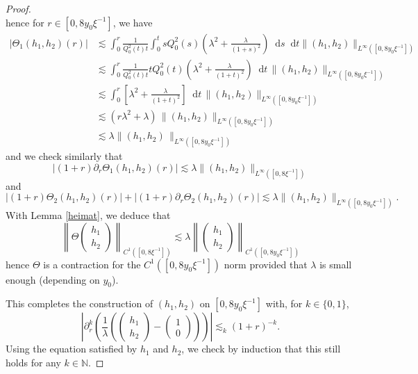 \documentclass[11 pt]{amsart}
\theoremstyle{definition}
\theoremstyle{remark}
\numberwithin{equation}{section}
\newcommand{\dd}{\mathop{}\!\mathrm{d}}
\begin{document}
\begin{proof}
\[  \]
  hence for $r \in [0, 8  y_0\xi^{- 1}]$, we have
  \begin{align*}
| \Theta_1 (h_1, h_2) (r) | & \lesssim \int_0^r \frac{1}{Q_0^2 (t) t} \int_0^t s Q_0^2 (s) \left(
    \lambda^2 + \frac{\lambda}{(1 + s)^2} \right) \dd s \dd t \| (h_1, h_2)
    \|_{L^{\infty} ([0, 8  y_0\xi^{- 1}])}\\
    & \lesssim \int_0^r \frac{1}{Q_0^2 (t) t} t Q_0^2 (t) \left( \lambda^2
    + \frac{\lambda}{(1 + t)^2} \right)\dd t \, \| (h_1, h_2) \|_{L^{\infty} ([0,
    8 y_0 \xi^{- 1}])}\\
    & \lesssim \int_0^r \left[ \lambda^2 + \frac{\lambda}{(1 + t)^2} \right] \dd t \, \| (h_1,
    h_2) \|_{L^{\infty} ([0, 8 y_0 \xi^{- 1}])}\\
    & \lesssim (r \lambda^2 + \lambda) \, \| (h_1, h_2) \|_{L^{\infty} ([0, 8 y_0
    \xi^{- 1}])}\\
    & \lesssim \lambda \| (h_1, h_2)\, \|_{L^{\infty} ([0, 8 y_0 \xi^{- 1}])}
  \end{align*}
  and we check similarly that
  \[ | (1 + r) \partial_r \Theta_1 (h_1, h_2) (r) | \lesssim \lambda\| (h_1, h_2)
     \|_{L^{\infty} ([0, 8 \xi^{- 1}])} \]
and
  \[ | (1 + r) \Theta_2 (h_1, h_2) (r) | + | (1 + r) \partial_r \Theta_2 (h_1,
     h_2) (r) | \lesssim \lambda \| (h_1, h_2) \|_{L^{\infty} ([0, 8 y_0 \xi^{-
     1}])} . \]
  With Lemma \ref{heimat}, we deduce that
  \[ \left\| \Theta \left(\begin{array}{c}
       h_1\\
       h_2
     \end{array}\right) \right\|_{C^1 ([0, 8 \xi^{- 1}])} \lesssim \lambda
     \left\| \left(\begin{array}{c}
       h_1\\
       h_2
     \end{array}\right) \right\|_{C^1 ([0, 8 y_0 \xi^{- 1}])} \]
  hence $\Theta$ is a contraction for the $C^1 ([0, 8 y_0 \xi^{- 1}])$ norm
  provided that $\lambda$ is small enough (depending on $y_0$).
  
  This completes the construction of $(h_1, h_2)$ on $[0, 8 y_0 \xi^{- 1}]$ with,
  for $k \in \{ 0, 1 \}$,
  \[ \left| \partial_r^k \left( \frac{1}{\lambda}\left( \left(\begin{array}{c}
       h_1\\
       h_2
     \end{array}\right) - \left(\begin{array}{c}
       1\\
       0
     \end{array}\right)\right)\right) \right| \lesssim_k (1 + r)^{- k} .
  \]
  Using the equation satisfied by $h_1$ and $h_2$, we check by induction that
  this still holds for any $k \in \mathbb{N}$.
  

\end{proof}
\end{document}
